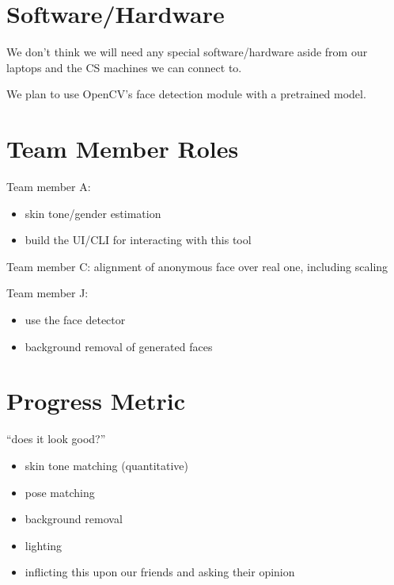 \section*{Software/Hardware}

We don't think we will need any special software/hardware aside from our laptops and the CS machines we can connect to.

We plan to use OpenCV's face detection module with a pretrained model.

\section*{Team Member Roles}


Team member A:
\begin{itemize}
    \item skin tone/gender estimation
    \item build the UI/CLI for interacting with this tool
\end{itemize}

Team member C: alignment of anonymous face over real one, including scaling

Team member J:
\begin{itemize}
    \item use the face detector
    \item background removal of generated faces
\end{itemize}


\section*{Progress Metric}


``does it look good?''

\begin{itemize}
    \item skin tone matching (quantitative)
    \item pose matching
    \item background removal
    \item lighting
    \item inflicting this upon our friends and asking their opinion
\end{itemize}

